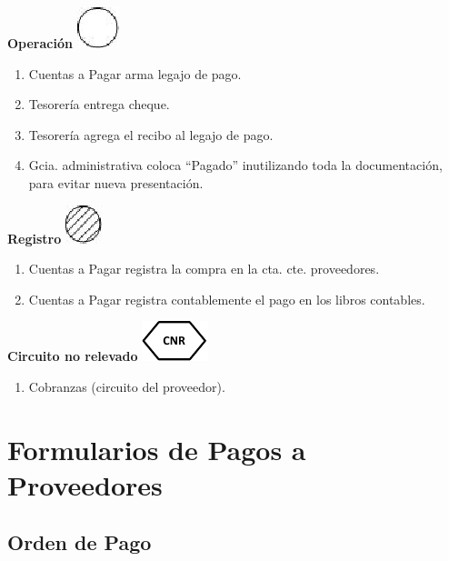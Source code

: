 \begin{center}
  \textbf{Operación}
  \includegraphics{./Images/Simbolos/simbolo-Operacion.png}
\end{center}
\begin{enumerate}
  \item Cuentas a Pagar arma legajo de pago.
  \item Tesorería entrega cheque.
  \item Tesorería agrega el recibo al legajo de pago.
  \item Gcia. administrativa coloca “Pagado” inutilizando toda la documentación, para evitar nueva presentación.
\end{enumerate}

\begin{center}
  \textbf{Registro}
  \includegraphics{./Images/Simbolos/simbolo-Registro.png}
\end{center}
\begin{enumerate}
  \item Cuentas a Pagar registra la compra en la cta. cte. proveedores.
  \item Cuentas a Pagar registra contablemente el pago en los libros contables. 
\end{enumerate}

\begin{center}
  \textbf{Circuito no relevado}
  \includegraphics{./Images/Simbolos/simbolo-CNR.png}
\end{center}
\begin{enumerate}
  \item Cobranzas (circuito del proveedor).
\end{enumerate}

\pagebreak
\section{Formularios de Pagos a Proveedores}
\subsection{Orden de Pago} 

